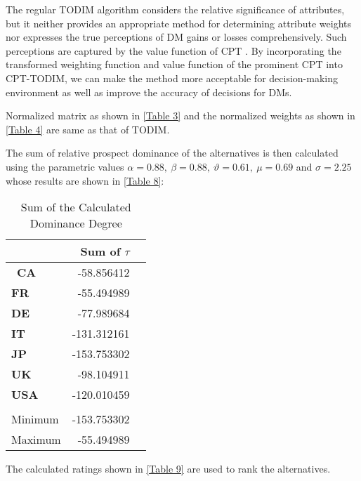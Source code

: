 \documentclass{infor}
\theoremstyle{remark}
\begin{document}
The regular TODIM algorithm considers the relative significance of attributes, but it neither provides an appropriate method for determining attribute weights nor expresses the true perceptions of DM gains or losses comprehensively. Such perceptions are captured by the value function of CPT \citep{tian2019extended}. By incorporating the transformed weighting function and value function of the prominent CPT into CPT-TODIM, we can make the method more acceptable for decision-making
environment as well as improve the accuracy of decisions for DMs.
\begin{steps}
\item Normalized matrix as shown in \autoref{Table 3} and the
normalized weights as shown in \autoref{Table 4} are same as that of TODIM.

\item The sum of relative prospect dominance of the
alternatives is then calculated using the parametric values
\(\alpha = 0.88,\ \beta = 0.88,\ \vartheta = 0.61,\ \mu = 0.69\) and
\(\sigma = 2.25\) whose results are shown in \autoref{Table 8}:

\begin{table}[!htp]\centering
\caption{Sum of the Calculated Dominance Degree}\label{Table 8} 
\scriptsize
\begin{tabular}{lrr}\toprule
& \textbf{Sum of} \(\tau\)\\\toprule
\
\textbf{CA} & -58.856412\\
\textbf{FR} & -55.494989\\
\textbf{DE} & -77.989684\\
\textbf{IT} & -131.312161\\
\textbf{JP} & -153.753302\\
\textbf{UK} & -98.104911\\
\textbf{USA} & -120.010459\\
&\\
\cmidrule{1-2}
Minimum & -153.753302\\
Maximum & -55.494989\\
\bottomrule
\end{tabular}
\end{table}

\item The calculated ratings shown in \autoref{Table 9} are used to rank
the alternatives.


\end{steps}
\end{document}
